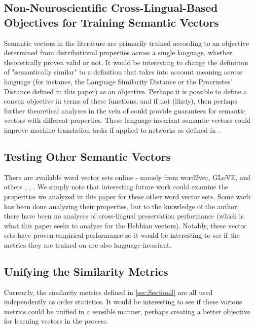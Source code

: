 \documentclass[12pt, usenames]{article}
\theoremstyle{definition}
\theoremstyle{definition}
\theoremstyle{definition}
\begin{document}
\subsection{Non-Neuroscientific Cross-Lingual-Based Objectives for Training Semantic Vectors}
Semantic vectors in the literature are primarily trained according to an objective determined from distributional properties across a single language, whether theoretically proven valid or not. It would be interesting to change the definition of "semantically similar" to a definition that takes into account meaning across language (for instance, the Language Similarity Distance or the Procrustes' Distance defined in this paper) as an objective. Perhaps it is possible to define a convex objective in terms of these functions, and if not (likely), then perhaps further theoretical analyses in the vein of \cite{Arora} could provide guarantees for semantic vectors with different properties. These language-invariant semantic vectors could improve machine translation tasks if applied to networks as defined in \cite{Sutskever}.

\subsection{Testing Other Semantic Vectors}
There are available word vector sets online - namely from word$2$vec, GLoVE, and others \cite{Mikolov}, \cite{Pennington}, \cite{Arora}. We simply note that interesting future work could examine the properities
we analyzed in this paper for these other word vector sets. Some work has been done analyzing their properties, but to the knowledge of the author, there have been no analyses of cross-lingual preservation performance (which is what this paper seeks to analyze for the Hebbian vectors). Notably, these vector sets have proven empirical performance so it would be interesting to see if the metrics they are trained on are also language-invariant.   

\subsection{Unifying the Similarity Metrics}

Currently, the similarity metrics defined in \autoref{sec:Section3} are all used independently as order statistics. It would be interesting to see if these various metrics could be unified in a sensible manner, perhaps creating a better objective for learning vectors in the process. 
\end{document}
